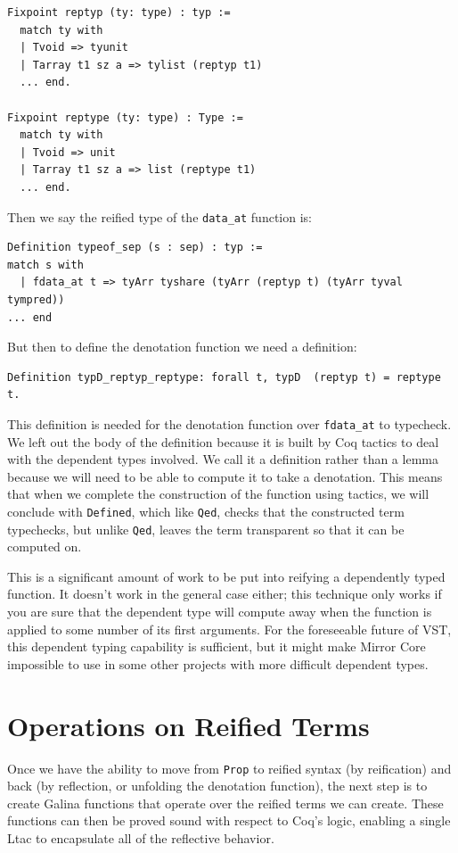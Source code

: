 \documentclass{puthesis}
\begin{document}
\begin{lstlisting}
Fixpoint reptyp (ty: type) : typ :=
  match ty with
  | Tvoid => tyunit
  | Tarray t1 sz a => tylist (reptyp t1)
  ... end.

Fixpoint reptype (ty: type) : Type :=
  match ty with
  | Tvoid => unit
  | Tarray t1 sz a => list (reptype t1)
  ... end.
\end{lstlisting}

Then we say the reified type of the \lstinline|data_at| function is:

\begin{lstlisting}
Definition typeof_sep (s : sep) : typ :=
match s with
  | fdata_at t => tyArr tyshare (tyArr (reptyp t) (tyArr tyval tympred))
... end
\end{lstlisting}

But then to define the denotation function we need a definition:

\begin{lstlisting}
Definition typD_reptyp_reptype: forall t, typD  (reptyp t) = reptype t.
\end{lstlisting}

This definition is needed for the denotation function over
\lstinline|fdata_at| to typecheck.
We left out the body of the definition because it is built by Coq
tactics to deal with the dependent types involved. We call it a
definition rather than a lemma because we will need to be able to
compute it to take a denotation. This means that when we complete the
construction of the function using tactics, we will conclude with 
\lstinline|Defined|, which like \lstinline|Qed|, checks that the
constructed term typechecks, but unlike \lstinline|Qed|, leaves the
term transparent so that it can be computed on.

This is a significant
amount of work to be put into reifying a dependently typed
function. It doesn't work in the general case either; this technique
only works if you are sure that the dependent type will compute away
when the function is applied to some number of its first
arguments. For the foreseeable future of VST, this dependent typing
capability is sufficient, but it might make Mirror Core impossible to
use in some other projects with more difficult dependent types.

\chapter{Operations on Reified Terms}

Once we have the ability to move from \lstinline|Prop| to reified
syntax (by reification) and back (by reflection, or unfolding the
denotation function), the next step is to create Galina functions that
operate over the reified terms we can create. These functions can then
be proved sound with respect to Coq's logic, enabling a single Ltac to
encapsulate all of the reflective behavior.
\end{document}

